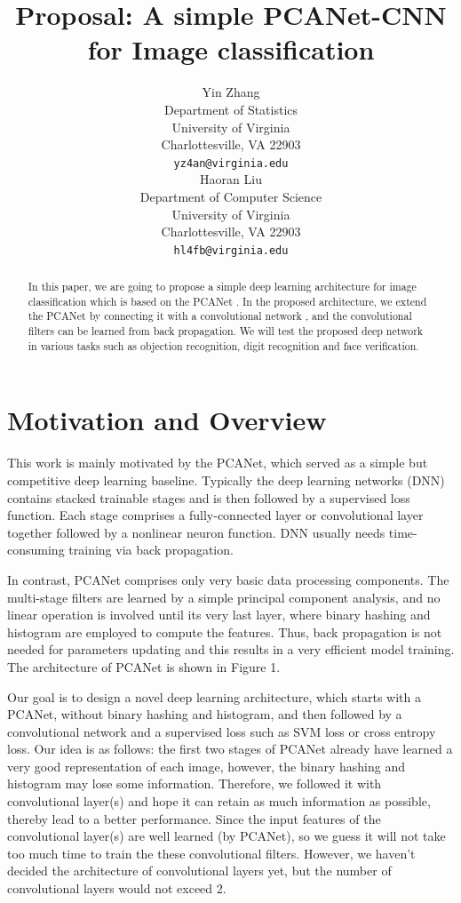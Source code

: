 \documentclass{article} %
\title{Proposal: A simple PCANet-CNN for Image classification}
\author{
Yin Zhang \\
Department of Statistics\\
University of Virginia\\
Charlottesville, VA 22903 \\
\texttt{yz4an@virginia.edu} \\
\And
Haoran Liu \\
Department of Computer Science \\
University of Virginia\\
Charlottesville, VA 22903  \\
\texttt{hl4fb@virginia.edu} \\
}
\begin{document}
\maketitle

\begin{abstract}

In this paper, we are going to propose a simple deep learning architecture for image classification which is based on the PCANet \cite{chan2015pcanet}. In the proposed architecture, we extend the PCANet by connecting it with a convolutional network \cite{krizhevsky2012imagenet}, and the convolutional filters can be learned from back propagation. We will test the proposed deep network in various tasks such as objection recognition, digit recognition and face verification.
\end{abstract}

\section{Motivation and Overview}
This work is mainly motivated by the PCANet, which served as a simple but competitive deep learning baseline. Typically the deep learning networks (DNN) contains stacked trainable stages and is then followed by a supervised loss function. Each stage comprises a fully-connected layer or convolutional layer together followed by a nonlinear neuron function. DNN usually needs time-consuming training via back propagation.

In contrast, PCANet comprises only very basic data processing components. The multi-stage filters are learned by a simple principal component analysis, and no linear operation is involved until its very last layer, where binary hashing and histogram are employed to compute the features. Thus, back propagation is not needed for parameters updating and this results in a very efficient model training. The architecture of PCANet is shown in Figure 1.

Our goal is to design a novel deep learning architecture, which starts with a PCANet, without binary hashing and histogram, and then followed by a convolutional network and a supervised loss such as SVM loss or cross entropy loss. Our idea is as follows: the first two stages of PCANet already have learned a very good representation of each image, however, the binary hashing and histogram may lose some information. Therefore, we followed it with convolutional layer(s) and hope it can retain as much information as possible, thereby lead to a better performance. Since the input features of the convolutional layer(s) are well learned (by PCANet), so we guess it will not take too much time to train the these convolutional filters. However, we haven't decided the architecture of convolutional layers yet, but the number of convolutional layers would not exceed 2.
\end{document}
